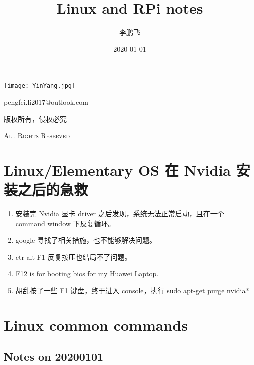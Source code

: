 \documentclass[UTF8,fancyhdr,a4paper]{ctexart}
\title{Linux and RPi notes}
\author{李鹏飞}
\date{2020-01-01}
\begin{document}
\begin{titlepage}
\maketitle
{}
\centering
\vspace{10cm}
\texttt{[image: YinYang.jpg]}\par
\vspace{1cm}
{\huge pengfei.li2017@outlook.com}\par
\vspace{0.5cm}
{\small 版权所有，侵权必究}\par
\vspace{0.5cm}
{\scshape \small All Rights Reserved}
\end{titlepage}

\tableofcontents
{}%
\clearpage
\listoffigures
{}
\clearpage
\listoftables
{}
\clearpage




\newpage
{}
\section{Linux/Elementary OS 在 Nvidia 安装之后的急救}
\begin{enumerate}
\item 安装完 Nvidia 显卡 driver 之后发现，系统无法正常启动，且在一个 command window 下反复循环。
\item google 寻找了相关措施，也不能够解决问题。
\item ctr alt F1 反复按压也结局不了问题。
\item F12 is for booting bios for my Huawei Laptop.
\item 胡乱按了一些 F1 键盘，终于进入 console，执行 sudo apt-get purge nvidia*

\end{enumerate}


\section{Linux common commands}

\subsection{Notes on 20200101}
\end{document}
